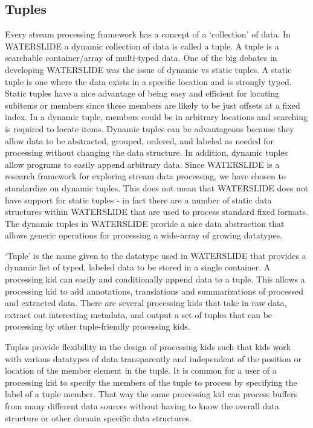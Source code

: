 \documentclass[11pt]{article}
\begin{document}
\subsection{Tuples}\label{sec:tuples}
Every stream processing framework has a concept of a `collection' of data.
In WATERSLIDE a dynamic collection of data is called a tuple.  A tuple is a 
searchable container/array of multi-typed data.  One of the big debates in 
developing WATERSLIDE was the issue of dynamic vs static tuples.  A static tuple 
is one where the data exists in a specific location and is strongly typed.  
Static tuples have a nice advantage of being easy and efficient for 
locating subitems or members since these members are likely to be just 
offsets at a fixed index.  In a dynamic tuple, members 
could be in arbitrary locations and searching is required to locate items.  
Dynamic tuples can be advantageous because they allow data to be abstracted, 
grouped, ordered, and labeled as needed for processing without changing the 
data structure.  In addition, dynamic tuples allow programs to easily append 
arbitrary data.  Since
WATERSLIDE is a research framework for exploring stream data processing, we 
have chosen to standardize on dynamic tuples.  This does not mean that 
WATERSLIDE does not have support for static tuples - in fact there are a number 
of static data structures within WATERSLIDE that are used to process standard 
fixed formats. The dynamic tuples in WATERSLIDE provide a nice 
data abstraction that allows generic operations for processing a wide-array of 
growing datatypes.

`Tuple' is the name given to the datatype used in WATERSLIDE that provides a 
dynamic list of typed, labeled data to be stored in a single container.  
A processing kid can easily and conditionally append data to a tuple.  This 
allows a processing kid to add annotations, translations and summarizations
of processed and extracted data.  There are several processing kids that take
in  raw data, extract out interesting metadata, and output a 
set of tuples that can be processing by other tuple-friendly processing kids.

Tuples provide flexibility in the design of processing kids such that kids 
work with various datatypes of data transparently and independent of the 
position or location of the member element in the tuple. It is common for 
a user of a processing kid to specify the members of the tuple to process by 
specifying the label of a tuple member. That way the same processing kid 
can process buffers from many different data sources without 
having to know the overall data structure or other domain specific data structures.  
\end{document}
